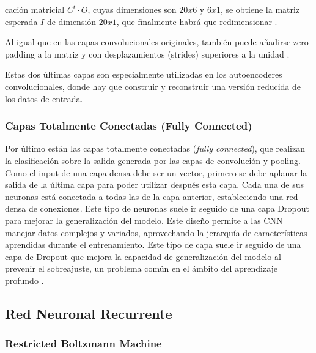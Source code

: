 cación matricial \(C^t \cdot O\), cuyas dimensiones son \(20x6\) y \(6x1\), se obtiene la matriz esperada $I$ de dimensión \(20x1\), que finalmente habrá que redimensionar \citep{pajares2021aprendizaje}.

Al igual que en las capas convolucionales originales, también puede añadirse zero-padding a la matriz y con desplazamientos (strides) superiores a la unidad \citep{pajares2021aprendizaje}.

Estas dos últimas capas son especialmente utilizadas en los autoencoderes convolucionales, donde hay que construir y reconstruir una versión reducida de los datos de entrada.

\subsubsection*{Capas Totalmente Conectadas (Fully Connected)}

Por último están las capas totalmente conectadas (\textit{fully connected}), que realizan la clasificación sobre la salida generada por las capas de convolución y pooling. Como el input de una capa densa debe ser un vector, primero se debe aplanar la salida de la última capa para poder utilizar después esta capa. Cada una de sus neuronas está conectada a todas las de la capa anterior, estableciendo una red densa de conexiones. Este tipo de neuronas suele ir seguido de una capa Dropout para mejorar la generalización del modelo. Este diseño permite a las CNN manejar datos complejos y variados, aprovechando la jerarquía de características aprendidas durante el entrenamiento. Este tipo de capa suele ir seguido de una capa de Dropout que mejora la capacidad de generalización del modelo al prevenir el sobreajuste, un problema común en el ámbito del aprendizaje profundo \citep{hossain2019classification}.



\subsection{Red Neuronal Recurrente}
\subsubsection{Restricted Boltzmann Machine}




















